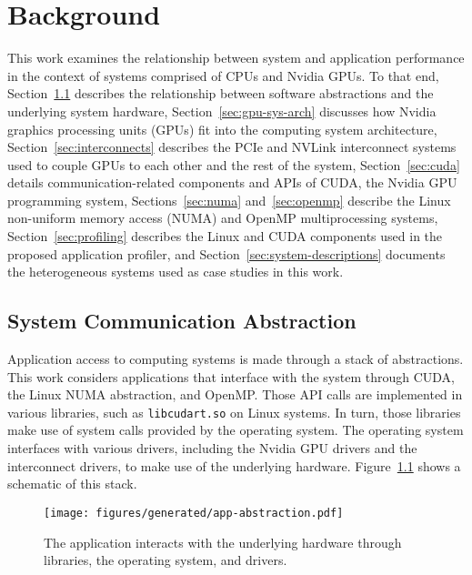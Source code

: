 \chapter{Background}
\label{ch:background}

This work examines the relationship between system and application performance in the context of systems comprised of CPUs and Nvidia GPUs.
To that end, 
Section~\ref{sec:sys-abstraction}            describes the relationship between software abstractions and the underlying system hardware,
Section~\ref{sec:gpu-sys-arch}               discusses how Nvidia graphics processing units (GPUs) fit into the computing system architecture,
Section~\ref{sec:interconnects}              describes the PCIe and NVLink interconnect systems used to couple GPUs to each other and the rest of the system,
Section~\ref{sec:cuda}                       details communication-related components and APIs of CUDA, the Nvidia GPU programming system,
Sections~\ref{sec:numa} and~\ref{sec:openmp} describe the Linux non-uniform memory access (NUMA) and OpenMP multiprocessing systems,
Section~\ref{sec:profiling}                  describes the Linux and CUDA components used in the proposed application profiler,
and Section~\ref{sec:system-descriptions}    documents the heterogeneous systems used as case studies in this work.

\section{System Communication Abstraction}
\label{sec:sys-abstraction}

Application access to computing systems is made through a stack of abstractions.
This work considers applications that interface with the system through CUDA, the Linux NUMA abstraction, and OpenMP.
Those API calls are implemented in various libraries, such as \texttt{libcudart.so} on Linux systems.
In turn, those libraries make use of system calls provided by the operating system.
The operating system interfaces with various drivers, including the Nvidia GPU drivers and the interconnect drivers, to make use of the underlying hardware.
Figure~\ref{fig:app-abstraction} shows a schematic of this stack.

\begin{figure}[ht]
    \centering
    \texttt{[image: figures/generated/app-abstraction.pdf]}
    \caption[System abstraction]{
		The application interacts with the underlying hardware through libraries, the operating system, and drivers.
	}
    \label{fig:app-abstraction}
\end{figure}

